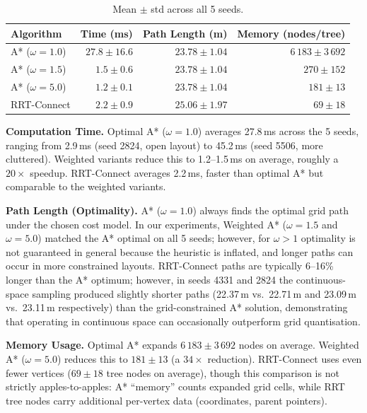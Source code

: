 \documentclass[11pt,a4paper]{article}
\begin{document}
\begin{table}[H]
\centering
\caption{Mean $\pm$ std across all 5 seeds.}
\label{tab:5seed_avg}
\footnotesize
\begin{tabular}{@{}lrrr@{}}
\toprule
\textbf{Algorithm} & \textbf{Time (ms)} & \textbf{Path Length (m)} & \textbf{Memory (nodes/tree)} \\
\midrule
A* ($\omega\!=\!1.0$)  & $27.8 \pm 16.6$ & $23.78 \pm 1.04$ & $6\,183 \pm 3\,692$ \\
A* ($\omega\!=\!1.5$)  & $1.5 \pm 0.6$   & $23.78 \pm 1.04$ & $270 \pm 152$ \\
A* ($\omega\!=\!5.0$)  & $1.2 \pm 0.1$   & $23.78 \pm 1.04$ & $181 \pm 13$ \\
RRT-Connect             & $2.2 \pm 0.9$   & $25.06 \pm 1.97$ & $69 \pm 18$ \\
\bottomrule
\end{tabular}
\end{table}

\textbf{Computation Time.}
Optimal A* ($\omega = 1.0$) averages 27.8\,ms across the 5 seeds, ranging from 2.9\,ms (seed 2824, open layout) to 45.2\,ms (seed 5506, more cluttered). Weighted variants reduce this to 1.2--1.5\,ms on average, roughly a $20\times$ speedup. RRT-Connect averages 2.2\,ms, faster than optimal A* but comparable to the weighted variants.

\textbf{Path Length (Optimality).}
A* ($\omega = 1.0$) always finds the optimal grid path under the chosen cost model. In our experiments, Weighted A* ($\omega = 1.5$ and $\omega = 5.0$) matched the A* optimal on all 5 seeds; however, for $\omega > 1$ optimality is not guaranteed in general because the heuristic is inflated, and longer paths can occur in more constrained layouts. RRT-Connect paths are typically 6--16\% longer than the A* optimum; however, in seeds 4331 and 2824 the continuous-space sampling produced slightly shorter paths (22.37\,m vs.\ 22.71\,m and 23.09\,m vs.\ 23.11\,m respectively) than the grid-constrained A* solution, demonstrating that operating in continuous space can occasionally outperform grid quantisation.

\textbf{Memory Usage.}
Optimal A* expands $6\,183 \pm 3\,692$ nodes on average. Weighted A* ($\omega = 5.0$) reduces this to $181 \pm 13$ (a $34\times$ reduction). RRT-Connect uses even fewer vertices ($69 \pm 18$ tree nodes on average), though this comparison is not strictly apples-to-apples: A* ``memory'' counts expanded grid cells, while RRT tree nodes carry additional per-vertex data (coordinates, parent pointers).
\end{document}
